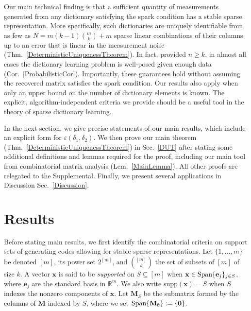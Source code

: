 \documentclass[9pt,twocolumn]{pnas-new}
\begin{document}
Our main technical finding is that a sufficient quantity of measurements generated from any dictionary satisfying the spark condition 
has a stable sparse representation.  More specifically, such dictionaries are uniquely identifiable from as few as \mbox{$N = m(k-1){m \choose k} + m$} sparse linear combinations of their columns up to an error that is linear in the measurement noise (Thm.~\ref{DeterministicUniquenessTheorem}). In fact, provided $n \geq k$, %
in almost all cases the dictionary learning problem is well-posed given enough data (Cor.~\ref{ProbabilisticCor}). Importantly, these guarantees hold without assuming the recovered matrix satisfies the spark condition. Our results  also apply when only an upper bound on the number of dictionary elements is known. The explicit, algorithm-independent criteria we provide should be a useful tool in the theory of sparse dictionary learning.  

In the next section, we give precise statements of our main results, which include an explicit form for $\varepsilon(\delta_1, \delta_2)$. We then prove our main theorem (Thm.~\ref{DeterministicUniquenessTheorem}) in Sec.~\ref{DUT} after stating some additional definitions and lemmas required for the proof, including our main tool from combinatorial matrix analysis (Lem.~\ref{MainLemma}). All other proofs are relegated to the Supplemental. 
Finally, we present several applications in Discussion Sec.~\ref{Discussion}.

\section{Results}\label{Results}

Before stating main results, we first identify the combinatorial criteria on support sets of generating codes allowing for stable sparse 
representations.  Let $\{1, \ldots, m\}$ be denoted $[m]$, its power set $2^{[m]}$, and ${[m] \choose k}$ the set of subsets of $[m]$ of size $k$. 
A vector $\mathbf{x}$ is said to be \emph{supported} on $S \subseteq [m]$ %
when $\mathbf{x} \in \text{\rm Span} \{\mathbf{e}_j\}_{j\in S}$, where $\mathbf{e}_j$ are the standard basis in $\mathbb R^m$.  We also write
 supp$(\mathbf{x}) = S$ when $S$ indexes the nonzero components of $\mathbf{x}$.
Let $\mathbf{M}_S$ be the submatrix formed by the columns of $\mathbf{M}$ indexed by $S$, where we set $\text{\rm Span}\{\mathbf{M}_\emptyset\} := \{\textbf{0}\}$.
\end{document}
